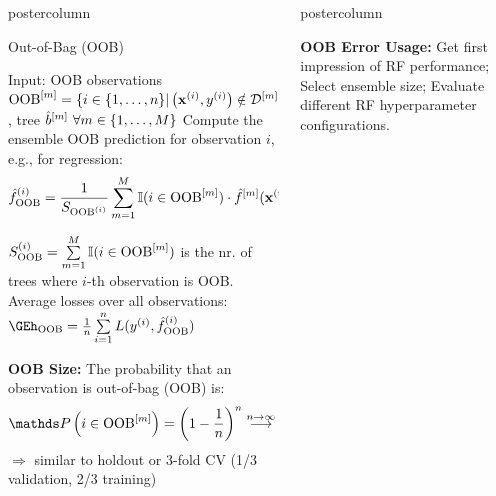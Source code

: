 \documentclass{beamer}
\newlength{\columnheight} %
\begin{document}
\begin{frame}[fragile]{}
\begin{columns}
\begin{column}{.31\textwidth}
\begin{beamercolorbox}[center]{postercolumn}
\begin{minipage}{.98\textwidth}
{      \begin{myblock}{Out-of-Bag (OOB)}
       \begin{algorithm}[H]
              \small
              \caption{Out-Of-Bag error estimation to evaluate different RF hyperparameter configurations}
              \begin{algorithmic}[1]
                \State Input: OOB observations $\mathrm{OOB}^{[m]} = \{i \in \{1, \ldots, n\} | \left(\mathbf{x}^{(i)}, y^{(i)}\right) \notin \mathcal{D}^{[m]}\}$, tree $\hat{b}^{[m]} \ \forall m \in \{1, \dots, M\}$
                  \State Compute the ensemble OOB prediction for observation $i$, e.g., for regression:
                  $$\hat{f}^{(i)}_{\mathrm{OOB}} =
                  \frac{1}{S_{\mathrm{OOB}^{(i)}}} \sum\limits_{m=1}^M
                  \mathbb{I}(i \in \mathrm{OOB}^{[m]}) \cdot \hat{f}^{[m]}(\mathbf{x}^{(i)}) $$

                  $S_{\mathrm{OOB}}^{(i)} = \sum\limits_{m=1}^M \mathbb{I}(i \in \mathrm{OOB}^{[m]})$ is the nr. of trees where $i$-th observation is OOB.
                \EndFor
                \State Average losses over all observations: $\GEh_{\oob} = \meanin L(\yi, \fh^{(i)}_{\oob})$
            
              \end{algorithmic}
            \end{algorithm}

            \textbf{OOB Size:} The probability that an observation is out-of-bag (OOB) is:
            $$\P \left(i \in \oobm\right) = \left(1 - \frac{1}{n}\right)^n \stackrel{n \to \infty}{\longrightarrow} \frac{1}{e} \approx 0.37$$
            $\Rightarrow$ similar to holdout or 3-fold CV (1/3 validation, 2/3 training)
            
\end{myblock}
}
\end{minipage}
\end{beamercolorbox}
\end{column}


\begin{column}{.31\textwidth}
\begin{beamercolorbox}[center]{postercolumn}
\begin{minipage}{.98\textwidth}
\parbox[t][\columnheight]{\textwidth}{
  \begin{myblock}{ }
\textbf{OOB Error Usage:}
Get first impression of RF performance; Select ensemble size; Evaluate different RF hyperparameter configurations.
\end{myblock}

}
\end{minipage}
\end{beamercolorbox}
\end{column}
\end{columns}
\end{frame}
\end{document}
